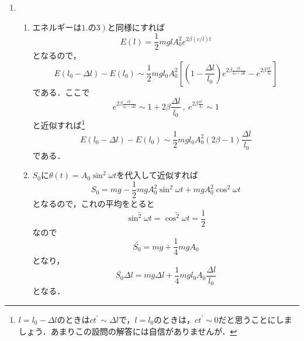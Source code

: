 \documentclass[a4paper,pdflatex,ja=standard]{bxjsarticle}
\begin{document}
\begin{enumerate}
  \item 
  \begin{enumerate}
    \item 
    エネルギーは$1.$の$\left.3\right)$と同様にすれば
    \begin{equation}
      E(l)
      =
      \frac{1}{2}mglA_{0}^2e^{2\beta (c/l)t}
    \end{equation}
    となるので，
    \begin{equation}
      E(l_{0}-\Delta l)
      -
      E(l_{0})
      \sim
      \frac{1}{2}mgl_{0}A_{0}^2
      \left[  
        \left( 1-\frac{\Delta l}{l_{0}} \right)e^{2\beta\frac{ct^{\prime}}{l_{0}-\Delta l}}
        -
        e^{2\beta\frac{ct^{\prime}}{l_{0}}}
      \right]
    \end{equation}
    である．ここで
    \begin{equation}
      e^{2\beta\frac{ct^{\prime}}{l_{0}-\Delta l}}
      \sim
      1+2\beta\frac{\Delta l}{l_{0}}
      \ ,\ 
      e^{2\beta\frac{ct^{\prime}}{l_{0}}}
      \sim
      1
    \end{equation}
    と近似すれば\footnote{
      $l=l_{0}-\Delta l$のときは$ct^{\prime}\sim\Delta l$で，$l=l_{0}$のときは，$ct^{\prime}\sim 0$だと思うことにしましょう．あまりこの設問の解答には自信がありませんが．
    }
    \begin{equation}
      E(l_{0}-\Delta l)
      -
      E(l_{0})
      \sim
      \frac{1}{2}mgl_{0}A_{0}^2
      (2\beta-1)\frac{\Delta l}{l_{0}}
    \end{equation}
    である．

    \item 
    $S_{0}$に$\theta(t)=A_{0}\sin^2 \omega t$を代入して近似すれば
    \begin{equation}
      S_{0}
      =
      mg
      -
      \frac{1}{2}mgA_{0}^2\sin^2\omega t
      +
      mgA_{0}^2\cos^2\omega t
    \end{equation}
    となるので，これの平均をとると
    \begin{equation}
      \bar{\sin^2 \omega t}
      =
      \bar{\cos^2 \omega t}
      =
      \frac{1}{2}
    \end{equation}
    なので
    \begin{equation}
      \bar{S_{0}}
      =
      mg
      +
      \frac{1}{4}mgA_{0}
    \end{equation}
    となり，
    \begin{equation}
      \bar{S_{0}}\Delta l
      =
      mg\Delta l
      +
      \frac{1}{4}mgl_{0}A_{0}\frac{\Delta l}{l_{0}}
      \label{work_ave}
    \end{equation}
    となる．


\end{enumerate}
\end{enumerate}
\end{document}
